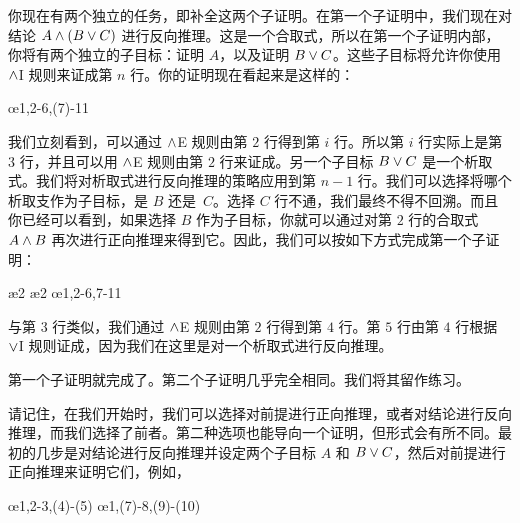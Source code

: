 你现在有两个独立的任务，即补全这两个子证明。在第一个子证明中，我们现在对结论 $A \wedge (B \vee C)$ 进行反向推理。这是一个合取式，所以在第一个子证明内部，你将有两个独立的子目标：证明 $A$，以及证明 $B \vee C$。这些子目标将允许你使用 $\wedge$I 规则来证成第 $n$ 行。你的证明现在看起来是这样的：


\begin{fitchproof}
	\PR
	\open
	\AS
	\ellipsesline
	\ellipsesline
	\close
	\open
	\AS
	\ellipsesline
	\close
	\oe{1,2-6,(7)-11}
\end{fitchproof}


我们立刻看到，可以通过 $\wedge$E 规则由第 $2$ 行得到第 $i$ 行。所以第 $i$ 行实际上是第 $3$ 行，并且可以用 $\wedge$E 规则由第 $2$ 行来证成。另一个子目标 $B \vee C$ 是一个析取式。我们将对析取式进行反向推理的策略应用到第 $n-1$ 行。我们可以选择将哪个析取支作为子目标，是 $B$ 还是~$C$。选择 $C$ 行不通，我们最终不得不回溯。而且你已经可以看到，如果选择 $B$ 作为子目标，你就可以通过对第 $2$ 行的合取式 $A \wedge B$ 再次进行正向推理来得到它。因此，我们可以按如下方式完成第一个子证明：


\begin{fitchproof}
	\PR
	\open
	\AS
	\ae{2}
	\ae{2}
	\close
	\open
	\AS
	\ellipsesline
	\close
	\oe{1,2-6,7-11}
\end{fitchproof}


与第 $3$ 行类似，我们通过 $\wedge$E 规则由第 $2$ 行得到第 $4$ 行。第 $5$ 行由第 $4$ 行根据 $\vee$I 规则证成，因为我们在这里是对一个析取式进行反向推理。

第一个子证明就完成了。第二个子证明几乎完全相同。我们将其留作练习。

请记住，在我们开始时，我们可以选择对前提进行正向推理，或者对结论进行反向推理，而我们选择了前者。第二种选项也能导向一个证明，但形式会有所不同。最初的几步是对结论进行反向推理并设定两个子目标 $A$ 和 $B \vee C$，然后对前提进行正向推理来证明它们，例如，


\begin{fitchproof}
	\PR
	\open
	\AS
	\ellipsesline
	\close
	\open
	\AS
	\ellipsesline
	\close
	\oe{1,2-3,(4)-(5)}
	\open
	\AS
	\ellipsesline
	\close
	\open
	\AS
	\ellipsesline
	\close
	\oe{1,(7)-8,(9)-(10)}
\end{fitchproof}



